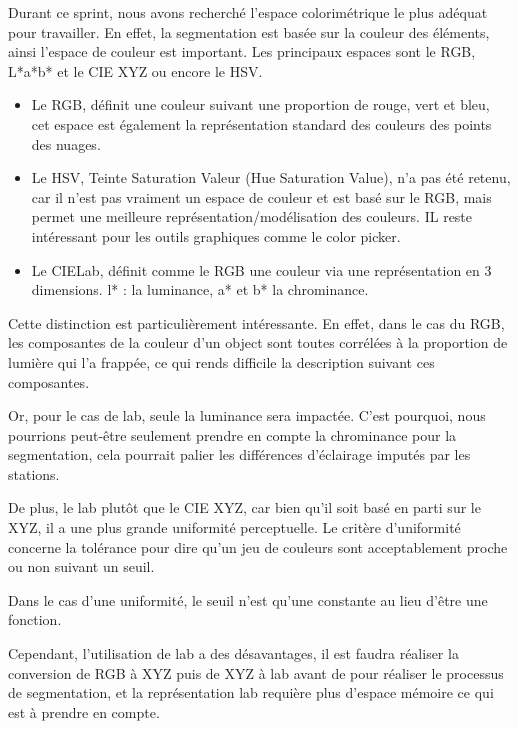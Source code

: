 \documentclass[12pt,titlepage,french]{article}
\begin{document}
Durant ce sprint, nous avons recherché l'espace colorimétrique le plus adéquat pour travailler.
En effet, la segmentation est basée sur la couleur des éléments, ainsi l'espace de couleur est important.
Les principaux espaces sont le RGB, L*a*b* et le CIE XYZ ou encore le HSV.
\begin{itemize}
    \item Le RGB, définit une couleur suivant une proportion de rouge, vert et bleu, cet espace est également la représentation standard des couleurs des points des nuages.
    \item Le HSV, Teinte Saturation Valeur (Hue Saturation Value), n'a pas été retenu, car il n'est pas vraiment un espace de couleur et est basé sur le RGB, mais permet une meilleure représentation/modélisation des couleurs.
IL reste intéressant pour les outils graphiques comme le color picker.
    \item Le CIELab, définit comme le RGB une couleur via une représentation en 3 dimensions. l* : la luminance, a* et b* la chrominance.
\end{itemize}
Cette distinction est particulièrement intéressante. En effet, dans le cas du RGB, les composantes de la couleur d'un object sont toutes corrélées à la proportion de lumière qui l'a frappée, ce qui rends difficile la description suivant ces composantes.

Or, pour le cas de lab, seule la luminance sera impactée. C'est pourquoi, nous pourrions peut-être seulement prendre en compte la chrominance pour la segmentation, cela pourrait palier les différences d'éclairage imputés par les stations.

De plus, le lab plutôt que le CIE XYZ, car bien qu'il soit basé en parti sur le XYZ, il a une plus grande uniformité perceptuelle. Le critère d'uniformité concerne la tolérance pour dire qu'un jeu de couleurs sont acceptablement proche ou non suivant un seuil.

Dans le cas d'une uniformité, le seuil n'est qu'une constante au lieu d'être une fonction.

Cependant, l'utilisation de lab a des désavantages, il est faudra réaliser la conversion de RGB à XYZ puis de XYZ à lab avant de pour réaliser le processus de segmentation, et la représentation lab requière plus d'espace mémoire ce qui est à prendre en compte.
\end{document}
